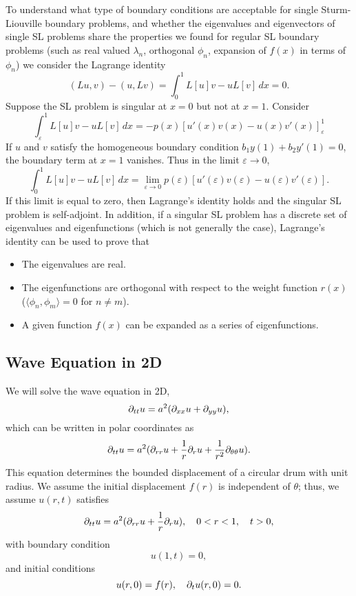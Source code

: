 
To understand what type of boundary conditions are acceptable for single Sturm-Liouville boundary problems, and whether the eigenvalues and eigenvectors of single SL problems share the properties we found for regular SL boundary problems (such as real valued $\lambda_n$, orthogonal $\phi_n$, expansion of $f(x)$ in terms of $\phi_n$) we consider the Lagrange identity
\[
	(Lu, v) - (u, Lv) = \int_0^1 L[u]v - uL[v] \,dx = 0.
\]
Suppose the SL problem is singular at $x=0$ but not at $x=1$. Consider
\[
	\int_{\varepsilon}^1 L[u]v - uL[v] \,dx = -p(x) [u'(x)v(x) - u(x)v'(x)]_{\varepsilon}^1
\]
If $u$ and $v$ satisfy the homogeneous boundary condition $b_1 y(1) + b_2 y'(1) = 0$, the boundary term at $x=1$ vanishes. Thus in the limit $\varepsilon \to 0$,
\[
	\int_0^1 L[u]v - uL[v] \,dx = \lim_{\varepsilon \to 0} p(\varepsilon) [u'(\varepsilon)v(\varepsilon) - u(\varepsilon)v'(\varepsilon)].
\]
If this limit is equal to zero, then Lagrange's identity holds and the singular SL problem is self-adjoint. In addition, if a singular SL problem has a discrete set of eigenvalues and eigenfunctions (which is not generally the case), Lagrange's identity can be used to prove that
\begin{itemize}
	\item The eigenvalues are real.
	\item The eigenfunctions are orthogonal with respect to the weight function $r(x)$ ($\langle \phi_n, \phi_m \rangle = 0$ for $n \neq m$).
	\item A given function $f(x)$ can be expanded as a series of eigenfunctions.
\end{itemize}


\subsection{Wave Equation in 2D}\label{sec:waveeqn2d}

We will solve the wave equation in 2D,
\[
	\partial_{tt}u = a^2(\partial_{xx}u + \partial_{yy}u),
\]
which can be written in polar coordinates as 
\[
	\partial_{tt}u = a^2(\partial_{rr}u + \frac{1}{r}\partial_r u + \frac{1}{r^2}\partial_{\theta\theta}u).
\]
This equation determines the bounded displacement of a circular drum with unit radius. We assume the initial displacement $f(r)$ is independent of $\theta$; thus, we assume $u(r,t)$ satisfies
\[
	\partial_{tt}u = a^2(\partial_{rr}u + \frac{1}{r}\partial_r u), \quad 0<r<1, \quad t>0,
\]
with boundary condition
\[
	u(1,t) = 0,
\]
and initial conditions
\[
	u(r,0) = f(r), \quad \partial_t u(r,0) = 0.
\]

